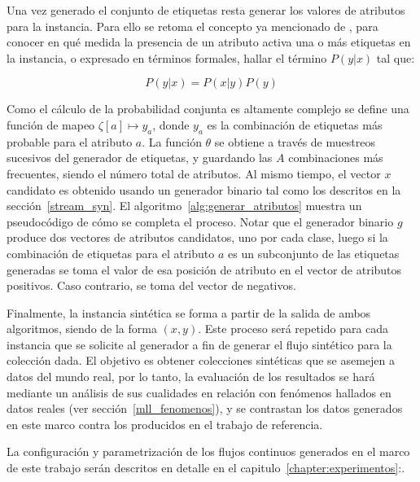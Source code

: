 Una vez generado el conjunto de etiquetas resta generar los valores de atributos
para la instancia. Para ello se retoma el concepto ya mencionado de
, para conocer en qué medida la presencia de
un atributo activa una o más etiquetas en la instancia, o expresado en términos
formales, hallar el término $P(y|x)$ tal que:

\begin{equation}
	P(y|x) = P(x|y)P(y)
\end{equation}

Como el cálculo de la probabilidad conjunta es altamente complejo se define una
función de mapeo $\zeta[a] \mapsto y_{a}$, donde $y_{a}$ es la combinación de
etiquetas más probable para el atributo $a$.  La función $\theta$ se obtiene a
través de muestreos sucesivos del generador de etiquetas, y guardando las $A$
combinaciones más frecuentes, siendo el número total de atributos. Al mismo
tiempo, el vector $x$ candidato es obtenido usando un generador binario tal como
los descritos en la sección~\ref{stream_syn}. El
algoritmo~\ref{alg:generar_atributos} muestra un pseudocódigo de cómo se
completa el proceso. Notar que el generador binario $g$ produce dos vectores de
atributos candidatos, uno por cada clase, luego si la combinación de etiquetas
para el atributo $a$ es un subconjunto de las etiquetas generadas se toma el
valor de esa posición de atributo en el vector de atributos positivos. Caso
contrario, se toma del vector de negativos.

Finalmente, la instancia sintética se forma a partir de la salida de ambos
algoritmos, siendo de la forma $(x, y)$. Este proceso será repetido para cada
instancia que se solicite al generador a fin de generar el flujo sintético para
la colección dada. El objetivo es obtener colecciones sintéticas que se asemejen
a datos del mundo real, por lo tanto, la evaluación de los resultados se hará
mediante un análisis de sus cualidades en relación con fenómenos hallados en
datos reales (ver sección~\ref{mll_fenomenos}), y se contrastan los datos
generados en este marco contra los producidos en el trabajo de referencia.

La configuración y parametrización de los flujos continuos generados en el marco
de este trabajo serán descritos en detalle en el
capitulo~\ref{chapter:experimentos}:.

